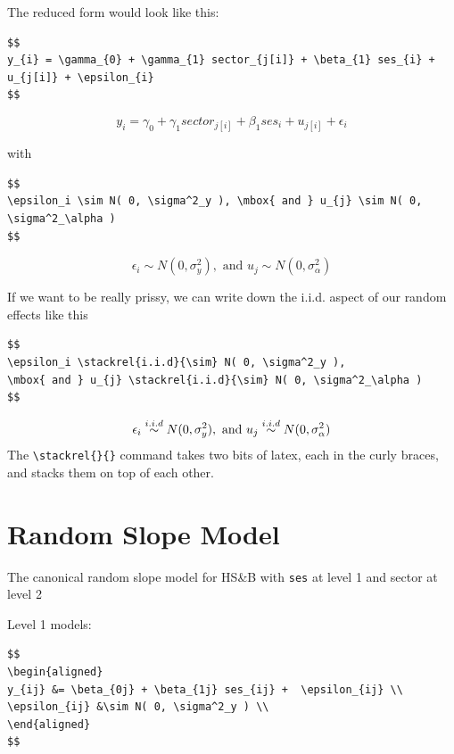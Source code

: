 \documentclass[
  letterpaper,
  DIV=11,
  numbers=noendperiod]{scrreprt}
\begin{document}
The reduced form would look like this:

\begin{verbatim}
$$
y_{i} = \gamma_{0} + \gamma_{1} sector_{j[i]} + \beta_{1} ses_{i} + u_{j[i]} + \epsilon_{i}
$$
\end{verbatim}

\[
y_{i} = \gamma_{0} + \gamma_{1} sector_{j[i]} + \beta_{1} ses_{i} + u_{j[i]} + \epsilon_{i}
\]

with

\begin{verbatim}
$$
\epsilon_i \sim N( 0, \sigma^2_y ), \mbox{ and } u_{j} \sim N( 0, \sigma^2_\alpha )
$$
\end{verbatim}

\[
\epsilon_i \sim N( 0, \sigma^2_y ), \mbox{ and } u_{j} \sim N( 0, \sigma^2_\alpha )
\]

If we want to be really prissy, we can write down the i.i.d. aspect of
our random effects like this

\begin{verbatim}
$$
\epsilon_i \stackrel{i.i.d}{\sim} N( 0, \sigma^2_y ), 
\mbox{ and } u_{j} \stackrel{i.i.d}{\sim} N( 0, \sigma^2_\alpha )
$$
\end{verbatim}

\[
\epsilon_i \stackrel{i.i.d}{\sim} N( 0, \sigma^2_y ), \\
\mbox{ and } u_{j} \stackrel{i.i.d}{\sim} N( 0, \sigma^2_\alpha )
\] The \texttt{\textbackslash{}stackrel\{\}\{\}} command takes two bits
of latex, each in the curly braces, and stacks them on top of each
other.

\hypertarget{random-slope-model}{%
\section{Random Slope Model}\label{random-slope-model}}

The canonical random slope model for HS\&B with \texttt{ses} at level 1
and sector at level 2

Level 1 models:

\begin{verbatim}
$$
\begin{aligned}
y_{ij} &= \beta_{0j} + \beta_{1j} ses_{ij} +  \epsilon_{ij} \\
\epsilon_{ij} &\sim N( 0, \sigma^2_y ) \\
\end{aligned}
$$
\end{verbatim}
\end{document}
